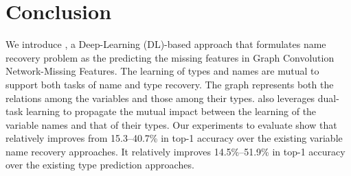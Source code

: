 \section{Conclusion}
\label{sec:conclusion}

We introduce {\tool}, a Deep-Learning (DL)-based approach that
formulates name recovery problem as the predicting the missing
features in Graph Convolution Network-Missing Features.  The learning
of types and names are mutual to support both tasks of name and type
recovery.  The graph represents both the relations among the variables
and those among their types. {\tool} also leverages dual-task learning
to propagate the mutual impact between the learning of the variable
names and that of their types. Our experiments to evaluate {\tool}
show that
{\tool} relatively improves from 15.3--40.7\% in top-1
accuracy over the existing variable name recovery approaches.
It relatively improves 14.5\%--51.9\% in top-1 accuracy over the
existing type prediction approaches. {\color{blue}{We plan to explore the
GCN-Missing Features in other problems in traditional languages, e.g.,
Java in which the attributes of a node could possess the domain logic,
or other properties, e.g., values.}}
